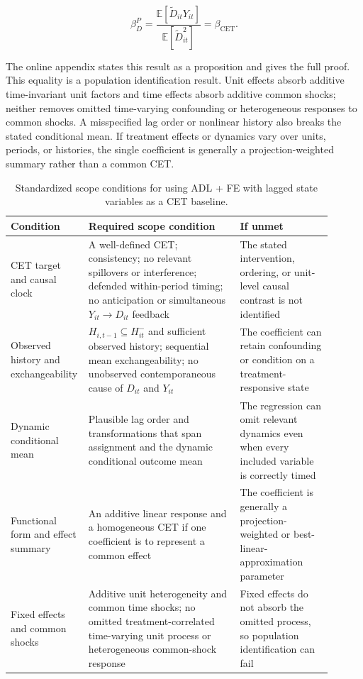 \documentclass[
]{article}
\begin{document}
\[
\beta_D^P
=
\frac{\mathbb{E}[\widetilde D_{it}Y_{it}]}{\mathbb{E}[\widetilde D_{it}^2]}
=
\beta_{\mathrm{CET}}.
\]

The online appendix states this result as a proposition and gives the
full proof. This equality is a population identification result. Unit
effects absorb additive time-invariant unit factors and time effects
absorb additive common shocks; neither removes omitted time-varying
confounding or heterogeneous responses to common shocks. A misspecified
lag order or nonlinear history also breaks the stated conditional mean.
If treatment effects or dynamics vary over units, periods, or histories,
the single coefficient is generally a projection-weighted summary rather
than a common CET.

\begin{table}[H]
\centering
\caption{Standardized scope conditions for using ADL + FE with lagged state variables as a CET baseline.}
\label{tab:adl_identification_estimation_pa}
\scriptsize
\setlength{\tabcolsep}{3pt}
\begin{tabular}{>{\raggedright\arraybackslash}p{0.16\linewidth} >{\raggedright\arraybackslash}p{0.46\linewidth} >{\raggedright\arraybackslash}p{0.28\linewidth}}
\toprule
Condition & Required scope condition & If unmet \\
\midrule
CET target and causal clock & A well-defined CET; consistency; no relevant spillovers or interference; defended within-period timing; no anticipation or simultaneous $Y_{it}\rightarrow D_{it}$ feedback & The stated intervention, ordering, or unit-level causal contrast is not identified \\
Observed history and exchangeability & $H_{i,t-1}\subseteq H_{it}^{-}$ and sufficient observed history; sequential mean exchangeability; no unobserved contemporaneous cause of $D_{it}$ and $Y_{it}$ & The coefficient can retain confounding or condition on a treatment-responsive state \\
Dynamic conditional mean & Plausible lag order and transformations that span assignment and the dynamic conditional outcome mean & The regression can omit relevant dynamics even when every included variable is correctly timed \\
Functional form and effect summary & An additive linear response and a homogeneous CET if one coefficient is to represent a common effect & The coefficient is generally a projection-weighted or best-linear-approximation parameter \\
Fixed effects and common shocks & Additive unit heterogeneity and common time shocks; no omitted treatment-correlated time-varying unit process or heterogeneous common-shock response & Fixed effects do not absorb the omitted process, so population identification can fail \\

\end{tabular}
\end{table}
\end{document}
